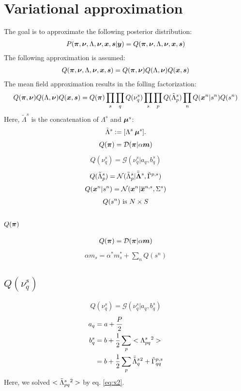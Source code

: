 \documentclass[a4paper]{article}
\begin{document}
\section{Variational approximation}
The goal is to approximate the following posterior distribution:
\begin{align}
  P(\boldsymbol{\pi},\boldsymbol{\nu},\Lambda,\boldsymbol{\nu},\boldsymbol{x},\boldsymbol{s}|\boldsymbol{y})=Q(\boldsymbol{\pi},\boldsymbol{\nu},\Lambda,\boldsymbol{\nu},\boldsymbol{x},\boldsymbol{s})
\end{align}
The following approximation is assumed:
\begin{align}
  Q(\boldsymbol{\pi},\boldsymbol{\nu},\Lambda,\boldsymbol{\nu},\boldsymbol{x},\boldsymbol{s})=Q(\boldsymbol{\pi},\boldsymbol{\nu})Q(\Lambda,\boldsymbol{\nu})Q(\boldsymbol{x},\boldsymbol{s})
\end{align}
The mean field approximation results in the folling factorization:
\begin{align}
  Q(\boldsymbol{\pi},\boldsymbol{\nu})Q(\Lambda,\boldsymbol{\nu})Q(\boldsymbol{x},\boldsymbol{s})=Q(\boldsymbol{\pi})\prod_s\prod_q Q(\nu_q^s)\prod_s\prod_p Q(\tilde{\Lambda}^s_p) \prod_n Q(\boldsymbol{x}^n|s^n)Q(s^n)
\end{align}
Here, $\tilde{\Lambda}^s$ is the concatenation of $\Lambda^s$ and $\boldsymbol{\mu}^s$:
\begin{align}
  \tilde{\Lambda}^s:=[\Lambda^s \: \boldsymbol{\mu}^s].
\end{align}
\begin{align}
  Q(\boldsymbol{\pi})=\mathcal{D}(\boldsymbol{\pi}|\alpha\boldsymbol{m})
\end{align}
\begin{align}
 Q(\nu^s_q)=\mathcal{G}(\nu^s_q|a_q, b_q^s)
\end{align}
\begin{align}
  Q(\tilde{\Lambda}^s_p)=\mathcal{N}(\tilde{\Lambda}^s_p|\bar{\tilde{\boldsymbol{\Lambda}}}^s,\tilde{\Gamma}^{p,s})
\end{align}
\begin{align}
  Q(\boldsymbol{x}^n|s^n)=\mathcal{N}(\boldsymbol{x}^n|\overline{\boldsymbol{x}}^{n,s},\Sigma^s)
\end{align}
\begin{align}
  Q(s^n)\text{ is }N\times S
\end{align}


\subsection{$Q(\boldsymbol{\pi})$}
\begin{align}
  Q(\boldsymbol{\pi})=\mathcal{D}(\boldsymbol{\pi}|\alpha\boldsymbol{m})
\end{align}
\begin{align}
  \alpha m_s=\alpha^*m^*_s+\sum_n Q(s^n)
\end{align}

\subsection{$Q(\nu_q^s)$}
\begin{align}
 Q(\nu^s_q)=\mathcal{G}(\nu^s_q|a_q, b_q^s)
\end{align}
\begin{align}
a_q&=a+\frac{P}{2} \\
b_q^s&=b+\frac{1}{2}\sum_p<\Lambda^s_{pq}{}^2> \\
&=b+\frac{1}{2}\sum_p \bar{\tilde{\Lambda}}^s_q{}^2 + \tilde{\Gamma}^{p,s}_{qq}
\end{align}
Here, we solved $<\tilde{\Lambda}^s_{pq}{}^2>$ by eq. \ref{eq:x2}.
\end{document}
